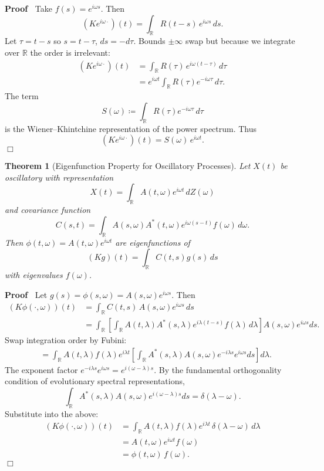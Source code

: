 \documentclass{article}
\newenvironment{proof}{\noindent\textbf{Proof\ }}{\hspace*{\fill}$\Box$\medskip}
\newtheorem{theorem}{Theorem}
\begin{document}
\begin{proof}
Take $f(s) = e^{i\omega s}$. Then
\[
(K e^{i\omega \cdot})(t) = \int_{\mathbb{R}} R(t-s)\, e^{i\omega s} \, ds.
\]
Let $\tau = t - s$ so $s = t - \tau$, $ds = -d\tau$. Bounds $\pm\infty$ swap but because we integrate over $\mathbb{R}$ the order is irrelevant:
\begin{align*}
(K e^{i\omega \cdot})(t) &= \int_{\mathbb{R}} R(\tau)\, e^{i\omega (t-\tau)} \, d\tau \\
&= e^{i\omega t} \int_{\mathbb{R}} R(\tau) e^{-i\omega \tau} \, d\tau.
\end{align*}
The term
\[
S(\omega) \coloneqq \int_{\mathbb{R}} R(\tau) e^{-i\omega \tau} \, d\tau
\]
is the Wiener--Khintchine representation of the power spectrum. Thus
\[
(K e^{i\omega\cdot})(t) = S(\omega) \, e^{i\omega t}.
\]
\end{proof}

\begin{theorem}
  [Eigenfunction Property for Oscillatory Processes]
  Let $X(t)$ be oscillatory with representation
  \[
  X (t) = \int_{\mathbb{R}} A (t, \omega) e^{i \omega t} \, dZ (\omega)
  \]
  and covariance function
  \[
  C(s, t) = \int_{\mathbb{R}} A(s, \omega) A^{\ast} (t, \omega) e^{i\omega(s-t)} f(\omega) \, d \omega.
  \]
  Then $\phi(t,\omega) = A(t,\omega) e^{i\omega t}$ are eigenfunctions of
  \[
  (K g)(t) = \int_{\mathbb{R}} C(t,s) g(s) \, ds
  \]
  with eigenvalues $f(\omega)$.
\end{theorem}

\begin{proof}
Let $g(s) = \phi(s,\omega) = A(s,\omega) e^{i\omega s}$. Then
\begin{align*}
(K\phi(\cdot,\omega))(t) &= \int_{\mathbb{R}} C(t,s) \, A(s,\omega) e^{i\omega s}\, ds \\
&= \int_{\mathbb{R}} \left[ \int_{\mathbb{R}} A(t,\lambda) A^*(s,\lambda) e^{i\lambda(t-s)} f(\lambda)\, d\lambda \right]
   A(s,\omega) e^{i\omega s} ds.
\end{align*}
Swap integration order by Fubini:
\begin{align*}
&= \int_{\mathbb{R}} A(t,\lambda) f(\lambda) e^{i\lambda t}
    \left[ \int_{\mathbb{R}} A^*(s,\lambda) A(s,\omega) e^{-i\lambda s} e^{i\omega s} ds \right] d\lambda.
\end{align*}
The exponent factor $e^{-i\lambda s} e^{i\omega s} = e^{i(\omega-\lambda)s}$.  
By the fundamental orthogonality condition of evolutionary spectral representations,
\[
\int_{\mathbb{R}} A^*(s,\lambda) A(s,\omega) e^{i(\omega-\lambda)s} ds = \delta(\lambda-\omega).
\]
Substitute into the above:
\begin{align*}
(K\phi(\cdot,\omega))(t) &= \int_{\mathbb{R}} A(t,\lambda) f(\lambda) e^{i\lambda t} \, \delta(\lambda-\omega)\, d\lambda \\
&= A(t,\omega) e^{i\omega t} f(\omega) \\
&= \phi(t,\omega) \, f(\omega).
\end{align*}
\end{proof}
\end{document}
